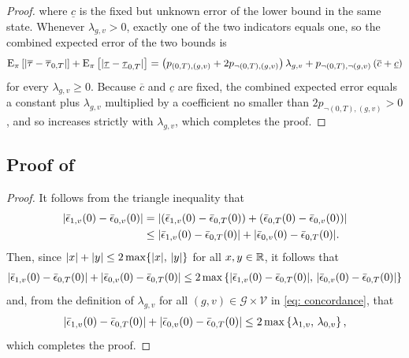 \documentclass[twoside,11pt]{article}
\begin{document}
\begin{proof}
where $\underline{c}$ is the fixed but unknown error of the lower bound in the same state. Whenever $\lambda_{g,v} > 0$, exactly one of the two indicators equals one, so the combined expected error of the two bounds is
\begin{align*}
\operatorname{\rm{E}}_{\pi}\left[\lvert\overline{\tau} - \overline{\tau}_{0,T}\rvert\right] + \operatorname{\rm{E}}_{\pi}\left[\lvert\underline{\tau} - \underline{\tau}_{0,T}\rvert\right] = \left(p_{(0,T),(g,v)} + 2 p_{\neg(0,T),(g,v)}\right) \lambda_{g,v} + p_{\neg(0,T),\neg(g,v)} \left(\overline{c} + \underline{c}\right)
\end{align*}
for every $\lambda_{g,v} \geq 0$. Because $\overline{c}$ and $\underline{c}$ are fixed, the combined expected error equals a constant plus $\lambda_{g,v}$ multiplied by a coefficient no smaller than $2 p_{\neg(0,T),(g,v)} > 0$, and so increases strictly with $\lambda_{g,v}$, which completes the proof.
\end{proof}

\subsection*{Proof of }

\begin{proof}
It follows from the triangle inequality that
\begin{align*}
\lvert\bar{\epsilon}_{1,v}(0) - \bar{\epsilon}_{0,v}(0)\rvert & = \lvert(\bar{\epsilon}_{1,v}(0) - \bar{\epsilon}_{0,T}(0)) + (\bar{\epsilon}_{0,T}(0) - \bar{\epsilon}_{0,v}(0))\rvert \\ 
& \leq \lvert\bar{\epsilon}_{1,v}(0) - \bar{\epsilon}_{0,T}(0)\rvert + \lvert\bar{\epsilon}_{0,v}(0) - \bar{\epsilon}_{0,T}(0)\rvert.
\end{align*}
Then, since $\lvert x\rvert + \lvert y\rvert \leq 2 \max\{\lvert x\rvert, \, \lvert y\rvert\}$ for all $x, y \in \operatorname{\mathbb{R}}$, it follows that
\begin{align*}
\lvert\bar{\epsilon}_{1,v}(0) - \bar{\epsilon}_{0,T}(0)\rvert + \lvert\bar{\epsilon}_{0,v}(0) - \bar{\epsilon}_{0,T}(0)\rvert \leq 2 \max\left\{\lvert\bar{\epsilon}_{1,v}(0) - \bar{\epsilon}_{0,T}(0)\rvert, \, \lvert\bar{\epsilon}_{0,v}(0) - \bar{\epsilon}_{0,T}(0)\rvert\right\}
\end{align*}
and, from the definition of $\lambda_{g,v}$ for all $(g,v) \in \mathcal{G} \times \mathcal{V}$ in \eqref{eq: concordance}, that 
\begin{align*}
\lvert\bar{\epsilon}_{1,v}(0) - \bar{\epsilon}_{0,T}(0)\rvert + \lvert\bar{\epsilon}_{0,v}(0) - \bar{\epsilon}_{0,T}(0)\rvert \leq 2 \max\left\{\lambda_{1,v}, \, \lambda_{0,v}\right\},
\end{align*}
which completes the proof.
\end{proof}
\end{document}
